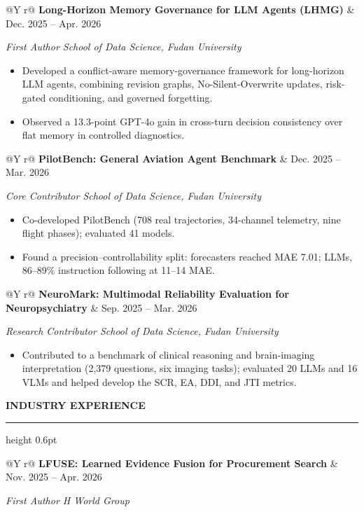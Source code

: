 \documentclass[10pt,a4paper]{article}
\makeatletter
\newcommand{\cvsection}[1]{%
  \vspace{4.8pt}%
  {\sffamily\bfseries\fontsize{10.9}{12.7}\selectfont
    \color{navy}\MakeUppercase{#1}}\par
  \vspace{1.5pt}%
  {\color{rule}\hrule height 0.6pt}\vspace{4.2pt}%
}
\newcommand{\entrytitle}[2]{%
  \begin{tabularx}{\linewidth}{@{}Y r@{}}
    {\sffamily\bfseries\fontsize{9.6}{11.7}\selectfont #1} &
    {\sffamily\fontsize{9.15}{11.7}\selectfont\color{muted} #2} \\
  \end{tabularx}\par
}
\newcommand{\entryrole}[1]{%
  {\itshape\fontsize{9.25}{11.55}\selectfont
    \color{muted}#1}\par\vspace{1.0pt}%
}
\newenvironment{cvitems}{%
  \begin{itemize}[
    label=\textbullet,
    leftmargin=11.5pt,
    labelsep=4.4pt,
    itemindent=0pt,
    topsep=0.3pt,
    partopsep=0pt,
    parsep=0pt,
    itemsep=2.0pt
  ]
  \fontsize{9.65}{12.15}\selectfont
}{\end{itemize}\vspace{2.7pt}}
\makeatother
\begin{document}
\entrytitle
  {Long-Horizon Memory Governance for LLM Agents (LHMG)}
  {Dec. 2025 -- Apr. 2026}

\entryrole{
  First Author
  \textbar{}
  School of Data Science, Fudan University
}

\begin{cvitems}
  \item Developed a conflict-aware memory-governance framework for
  long-horizon LLM agents, combining revision graphs, No-Silent-Overwrite
  updates, risk-gated conditioning, and governed forgetting.

  \item Observed a 13.3-point GPT-4o gain in cross-turn decision
  consistency over flat memory in controlled diagnostics.
\end{cvitems}

\entrytitle
  {PilotBench: General Aviation Agent Benchmark}
  {Dec. 2025 -- Mar. 2026}

\entryrole{
  Core Contributor
  \textbar{}
  School of Data Science, Fudan University
}

\begin{cvitems}
  \item Co-developed PilotBench (708 real trajectories, 34-channel
  telemetry, nine flight phases); evaluated 41 models.

  \item Found a precision--controllability split: forecasters reached
  MAE 7.01; LLMs, 86--89\% instruction following at 11--14 MAE.
\end{cvitems}

\entrytitle
  {NeuroMark: Multimodal Reliability Evaluation for Neuropsychiatry}
  {Sep. 2025 -- Mar. 2026}

\entryrole{
  Research Contributor
  \textbar{}
  School of Data Science, Fudan University
}

\begin{cvitems}
  \item Contributed to a benchmark of clinical reasoning and brain-imaging
  interpretation (2,379 questions, six imaging tasks); evaluated 20 LLMs
  and 16 VLMs and helped develop the SCR, EA, DDI, and JTI metrics.
\end{cvitems}

\cvsection{Industry Experience}

\entrytitle
  {LFUSE: Learned Evidence Fusion for Procurement Search}
  {Nov. 2025 -- Apr. 2026}

\entryrole{
  First Author
  \textbar{}
  H World Group
}
\end{document}
